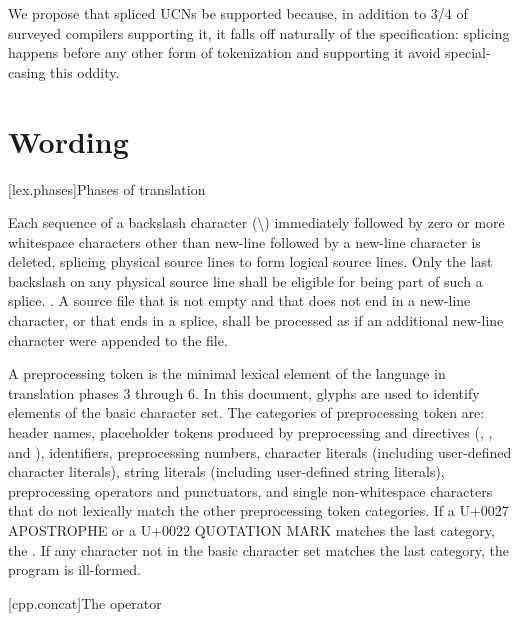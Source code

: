 \documentclass{wg21}
\begin{document}
We propose that spliced UCNs be supported because, in addition to 3/4 of surveyed compilers supporting it,
it falls off naturally of the specification: splicing happens before any other form of tokenization and supporting it avoid
special-casing this oddity.

\section{Wording}

[lex.phases]{Phases of translation}

%
Each sequence of a backslash character (\textbackslash)
immediately followed by
zero or more whitespace characters other than new-line followed by
a new-line character is deleted, splicing
physical source lines to form logical source lines. Only the last
backslash on any physical source line shall be eligible for being part
of such a splice.
. A source file that is not empty and that does not end in a new-line
character, or that ends in a splice,
shall be processed as if an additional new-line character were appended
to the file.

\pnum
A preprocessing token is the minimal lexical element of the language in translation
phases 3 through 6.
In this document,
glyphs are used to identify
elements of the basic character set.
The categories of preprocessing token are: header names,
placeholder tokens produced by preprocessing  and  directives
(, , and ),
identifiers, preprocessing numbers, character literals (including user-defined character
literals), string literals (including user-defined string literals), preprocessing
operators and punctuators, and single non-whitespace characters that do not lexically
match the other preprocessing token categories.
If a U+0027 APOSTROPHE or a U+0022 QUOTATION MARK
matches the last category, the .
If any character not in the basic character set matches the last category,
the program is ill-formed.

[cpp.concat]{The \tcode{\#\#} operator}%
%
\end{document}

